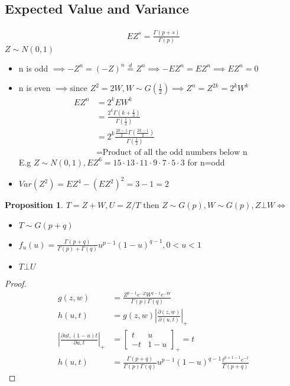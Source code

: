 \documentclass{article}
\theoremstyle{definition}
\theoremstyle{thrm}
\theoremstyle{lma}
\theoremstyle{ppst}
\newtheorem{ppst}{Proposition}[section]
\theoremstyle{crlr}
\begin{document}
\subsection{Expected Value and Variance}
\begin{align*}
	EZ^s = \frac{\Gamma(p+s)}{\Gamma(p)}
\end{align*}
$Z\sim N(0,1)$
\begin{itemize}
	\item n is odd $\implies -Z^n = (-Z)^n\stackrel{d}{=}Z^n \implies -EZ^n = EZ^n \implies EZ^n = 0$
	\item n is even $\implies \text{since } Z^2 = 2W, W\sim G(\frac{1}{2}) \implies Z^n = Z^{2k} = 2^kW^k$
	\begin{align*}
		EZ^n &= 2^kEW^k\\
		&=\frac{2^k\Gamma(k+\frac{1}{2})}{\Gamma(\frac{1}{2})}\\
		&=2^k\frac{\frac{2k-1}{2}\Gamma(\frac{2k-1}{2})}{\Gamma(\frac{1}{2})}\\
		&=\text{Product of all the odd numbers below n}
	\end{align*}
	E.g $Z\sim N(0,1), EZ^6 = 15\cdot 13\cdot 11\cdot 9\cdot 7\cdot 5 \cdot 3$ for n=odd
	\item $Var(Z^2) = EZ^4-(EZ^2)^2 = 3-1=2$
\end{itemize}
\begin{ppst}
	$T = Z+W, U = Z/T \text{ then }Z\sim G(p), W\sim G(p),Z\bot W \iff $
	\begin{itemize}
		\item $T\sim G(p+q)$
		\item $f_u(u) = \frac{\Gamma(p+q)}{\Gamma(p)+\Gamma(q)}u^{p-1}(1-u)^{q-1}, 0<u<1$
		\item $T\bot U$
	\end{itemize}
\end{ppst}
\begin{proof}
	\begin{align*}
		g(z,w) &=\frac{Z^{p-1}e^{-Z}W^{q-1}e^{-W}}{\Gamma(p)\Gamma(q)}\\
		h(u,t) &= g(z,w)|\frac{\partial(z,w)}{\partial(u,t)}|_+\\
		|\frac{\partial ut, (1-u)t}{\partial u,t}|_+ &= \begin{bmatrix}
			t &u\\
			-t & 1-u
		\end{bmatrix}_+ = t\\
		h(u,t) &= \frac{\Gamma(p+q)}{\Gamma(p)\Gamma(q)}u^{p-1}(1-u)^{q-1}\frac{t^{p+1-1}e^{-t}}{\Gamma(p+q)}
	\end{align*}
\end{proof}
\end{document}
